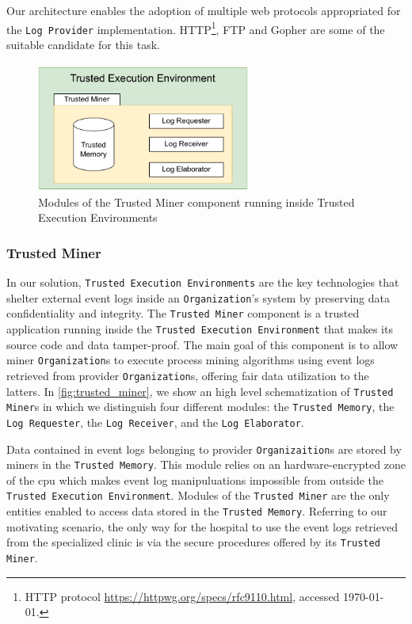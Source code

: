 Our architecture enables the adoption of multiple web protocols appropriated for the \texttt{Log Provider} implementation. HTTP\footnote{HTTP protocol \url{https://httpwg.org/specs/rfc9110.html}, accessed \today.}, FTP and Gopher are some of the suitable candidate for this task.
\label{fig:trusted_miner}
\begin{figure}[t]
\centering
\includegraphics[width=7cm]{content/figures/Trusted_miner.pdf}
\caption{Modules of the Trusted Miner component running inside Trusted Execution Environments}
\label{fig:implementation}
\end{figure}
\subsubsection{Trusted Miner}
In our solution, \texttt{Trusted Execution Environments} are the key technologies that shelter external event logs inside an \texttt{Organization}'s system by preserving data confidentiality and integrity. The \texttt{Trusted Miner} component is a trusted application running inside the \texttt{Trusted Execution Environment} that makes its source code and data tamper-proof. The main goal of this component is to allow miner \texttt{Organization}s to execute process mining algorithms using %
event logs retrieved from provider \texttt{Organization}s, offering fair data utilization to the latters. In \cref{fig:trusted_miner}, we show an high level schematization of \texttt{Trusted Miner}s in which we distinguish four different modules: the \texttt{Trusted Memory}, the \texttt{Log Requester}, the \texttt{Log Receiver}, and the \texttt{Log Elaborator}.

Data contained in event logs belonging to provider \texttt{Organizaition}s are stored by miners in the \texttt{Trusted Memory}. This module relies on an hardware-encrypted zone of the cpu which makes event log manipuluations impossible from outside the \texttt{Trusted Execution Environment}. Modules of the \texttt{Trusted Miner} are the only entities enabled to access data stored in the \texttt{Trusted Memory}. Referring to our motivating scenario, the only way for the hospital to use the event logs retrieved from the specialized clinic is via the secure procedures offered by its \texttt{Trusted Miner}.

